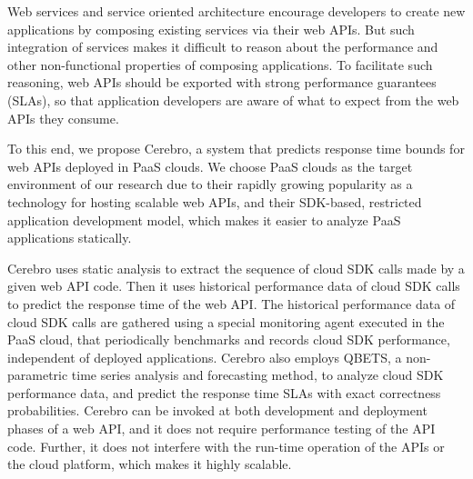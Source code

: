 Web services and service oriented architecture encourage developers to create new applications by
composing existing services via their web APIs. But such integration of services makes it difficult to
reason about the performance and other non-functional properties of composing applications. To
facilitate such reasoning, web APIs should be exported with strong performance guarantees (SLAs),
so that application developers are aware of what to expect from the web APIs they consume. 

To this end,
we propose Cerebro, a system that predicts response time bounds for web APIs deployed in PaaS clouds. We
choose PaaS clouds as the target environment of our research due to their rapidly growing popularity as a technology
for hosting scalable web APIs, and their SDK-based, restricted application development model, 
which makes it easier to analyze PaaS applications statically.

Cerebro uses static analysis to extract the sequence of cloud SDK calls made by a given web API code. Then it
uses historical performance data of cloud SDK calls to predict the response time of the web
API. The historical performance data of cloud SDK calls are gathered using a special monitoring agent
executed in the PaaS cloud, that periodically benchmarks and records cloud SDK performance, independent
of deployed applications.
Cerebro also employs QBETS, a non-parametric time series analysis and forecasting method, to analyze
cloud SDK performance data, and predict the response time SLAs with exact correctness
probabilities. Cerebro can be invoked at both development and deployment phases of a web API, and 
it does not require performance testing of the API code. Further, it does not interfere with the run-time operation
of the APIs or the cloud platform, which makes it highly scalable.

